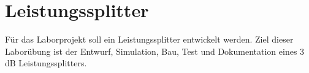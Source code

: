 \section{Leistungssplitter}
Für das Laborprojekt soll ein Leistungssplitter entwickelt werden. Ziel dieser Laborübung ist der Entwurf, Simulation, Bau, Test und Dokumentation eines 3 dB Leistungssplitters.